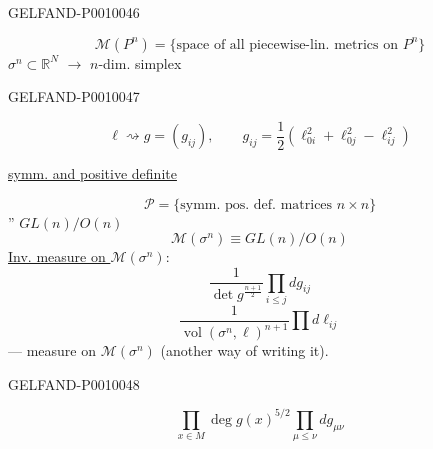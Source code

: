 \begin{GelfandAdjacentEvidence}{GELFAND-P001004}{6}

\begin{equation*}
\mathcal M(P^n)=\{\text{space of all piecewise-lin. metrics on }P^n\}\tag{21}
\end{equation*}
$\sigma^n\subset\mathbb R^N$ \(\xrightarrow{\quad}\) $n$-dim. simplex

\end{GelfandAdjacentEvidence}
\begin{GelfandAdjacentEvidence}{GELFAND-P001004}{7}


\[
\ell\rightsquigarrow g=(g_{ij}),\qquad
g_{ij}=\frac12(\ell_{0i}^2+\ell_{0j}^2-\ell_{ij}^2)
\]
\begin{flushright}\underline{symm. and positive definite}\end{flushright}
\[
\mathcal P=\{\text{symm. pos. def. matrices }n\times n\}
\]
'' $GL(n)/O(n)$
\[
\mathcal M(\sigma^n)\equiv GL(n)/O(n)
\]
\underline{Inv. measure on $\mathcal M(\sigma^n)$}:
\begin{equation*}
\frac{1}{\det g^{\frac{n+1}{2}}}\prod_{i\le j}dg_{ij}\tag{22}
\end{equation*}
\begin{equation*}
\frac{1}{\operatorname{vol}(\sigma^n,\ell)^{n+1}}\prod d\ell_{ij}\tag{23}
\end{equation*}
--- measure on $\mathcal M(\sigma^n)$ (another way of writing it).
\end{GelfandAdjacentEvidence}
\begin{GelfandAdjacentEvidence}{GELFAND-P001004}{8}

\begin{equation*}
\prod_{x\in M}\operatorname{deg}g(x)^{5/2}\prod_{\mu\le\nu}dg_{\mu\nu}\tag{24}
\end{equation*}
\end{GelfandAdjacentEvidence}



